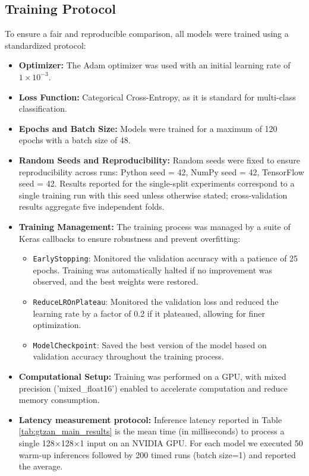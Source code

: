 \documentclass[11pt,a4paper]{article}
\begin{document}
\subsection{Training Protocol}
To ensure a fair and reproducible comparison, all models were trained using a standardized protocol:
\begin{itemize}
    \item \textbf{Optimizer:} The Adam optimizer was used with an initial learning rate of \(1 \times 10^{-3}\).
    \item \textbf{Loss Function:} Categorical Cross-Entropy, as it is standard for multi-class classification.
    \item \textbf{Epochs and Batch Size:} Models were trained for a maximum of 120 epochs with a batch size of 48.
    \item \textbf{Random Seeds and Reproducibility:} Random seeds were fixed to ensure reproducibility across runs: Python seed = 42, NumPy seed = 42, TensorFlow seed = 42. Results reported for the single-split experiments correspond to a single training run with this seed unless otherwise stated; cross-validation results aggregate five independent folds.
    \item \textbf{Training Management:} The training process was managed by a suite of Keras callbacks to ensure robustness and prevent overfitting:
    \begin{itemize}
        \item \texttt{EarlyStopping}: Monitored the validation accuracy with a patience of 25 epochs. Training was automatically halted if no improvement was observed, and the best weights were restored.
        \item \texttt{ReduceLROnPlateau}: Monitored the validation loss and reduced the learning rate by a factor of 0.2 if it plateaued, allowing for finer optimization.
        \item \texttt{ModelCheckpoint}: Saved the best version of the model based on validation accuracy throughout the training process.
    \end{itemize}
    \item \textbf{Computational Setup:} Training was performed on a GPU, with mixed precision ('mixed\_float16') enabled to accelerate computation and reduce memory consumption.
    \item \textbf{Latency measurement protocol:} Inference latency reported in Table \ref{tab:gtzan_main_results} is the mean time (in milliseconds) to process a single 128\(\times\)128\(\times\)1 input on an NVIDIA GPU. For each model we executed 50 warm-up inferences followed by 200 timed runs (batch size=1) and reported the average.
\end{itemize}
\end{document}
